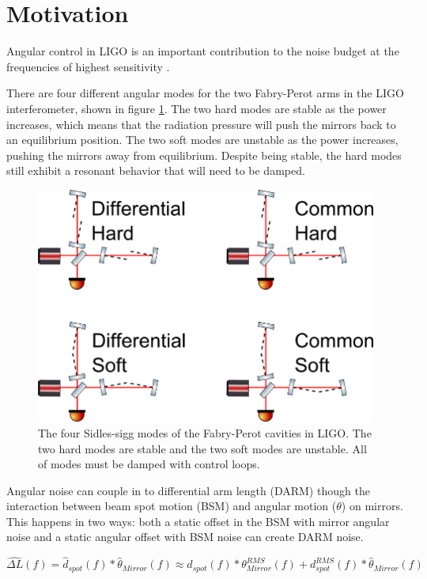 \section{Motivation}

Angular control in LIGO is an important contribution to the noise budget at the frequencies of highest sensitivity \cite{T0900511}. 

There are four different angular modes for the two Fabry-Perot arms in the LIGO interferometer, shown in figure \ref{fig:sidlessiggmodes}. 
The two hard modes are stable as the power increases, which means that the radiation pressure will push the mirrors back to an equilibrium position.
The two soft modes are unstable as the power increases, pushing the mirrors away from equilibrium. 
Despite being stable, the hard modes still exhibit a resonant behavior that will need to be damped.

\begin{figure}[htp]%
\includegraphics[width=.8\textwidth]{figures/application/SidlesSigg}%
\caption[Sidles-Sigg Modes]{The four Sidles-sigg modes of the Fabry-Perot cavities in LIGO. The two hard modes are stable and the two soft modes are unstable. All of modes must be damped with control loops.}%
\label{fig:sidlessiggmodes}%
\end{figure}

Angular noise can couple in to differential arm length (DARM) though the interaction between beam spot motion (BSM) and angular motion ($\theta$) on mirrors. This happens in two ways: both a static offset in the BSM with mirror angular noise and a static angular offset with BSM noise can create DARM noise. 

\begin{equation}
\hat{\Delta L}(f) = \hat{d}_{spot}(f)*\hat{\theta}_{Mirror}(f) \approx \hat{d}_{spot}(f)*\theta_{Mirror}^{RMS}(f) + d_{spot}^{RMS}(f)*\hat{\theta}_{Mirror}(f)
\label{eq:darmcouple}
\end{equation}


